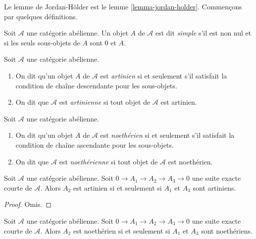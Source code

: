 \noindent
Le lemme de Jordan-H\"older est le lemme \ref{lemma-jordan-holder}.
Commençons par quelques définitions.

\begin{definition}
\label{definition-simple}
Soit $\mathcal{A}$ une catégorie abélienne. Un objet $A$ de $\mathcal{A}$
est dit {\it simple} s'il est non nul et si les seuls sous-objets
de $A$ sont $0$ et $A$.
\end{definition}

\begin{definition}
\label{definition-Artinian}
Soit $\mathcal{A}$ une catégorie abélienne.
\begin{enumerate}
\item On dit qu'un objet $A$ de $\mathcal{A}$ est {\it artinien} si et seulement s'il
satisfait la condition de chaîne descendante pour les sous-objets.
\item On dit que $\mathcal{A}$ est {\it artinienne} si tout objet de
$\mathcal{A}$ est artinien.
\end{enumerate}
\end{definition}

\begin{definition}
\label{definition-Noetherian}
Soit $\mathcal{A}$ une catégorie abélienne.
\begin{enumerate}
\item On dit qu'un objet $A$ de $\mathcal{A}$ est {\it noethérien} si et seulement s'il
satisfait la condition de chaîne ascendante pour les sous-objets.
\item On dit que $\mathcal{A}$ est {\it noethérienne} si tout objet de
$\mathcal{A}$ est noethérien.
\end{enumerate}
\end{definition}

\begin{lemma}
\label{lemma-ses-artinian}
Soit $\mathcal{A}$ une catégorie abélienne. Soit $0 \to A_1 \to A_2 \to A_3 \to 0$
une suite exacte courte de $\mathcal{A}$. Alors $A_2$ est artinien
si et seulement si $A_1$ et $A_3$ sont artiniens.
\end{lemma}

\begin{proof}
Omis.
\end{proof}

\begin{lemma}
\label{lemma-ses-noetherian}
Soit $\mathcal{A}$ une catégorie abélienne. Soit $0 \to A_1 \to A_2 \to A_3 \to 0$
une suite exacte courte de $\mathcal{A}$. Alors $A_2$ est noethérien
si et seulement si $A_1$ et $A_3$ sont noethériens.
\end{lemma}

